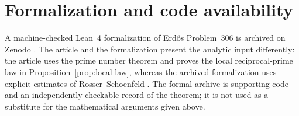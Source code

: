 \section{Formalization and code availability}\label{sec:formalization}

A machine-checked Lean~4 formalization of Erd\H{o}s Problem~306 is archived on
Zenodo \cite{TangErdos306}.  The article and the formalization present the
analytic input differently: the article uses the prime number theorem and
proves the local reciprocal-prime law in Proposition~\ref{prop:local-law},
whereas the archived formalization uses explicit estimates of
Rosser--Schoenfeld \cite{RosserSchoenfeld1962}.  The formal archive is supporting
code and an independently checkable record of the theorem; it is not used as a
substitute for the mathematical arguments given above.

